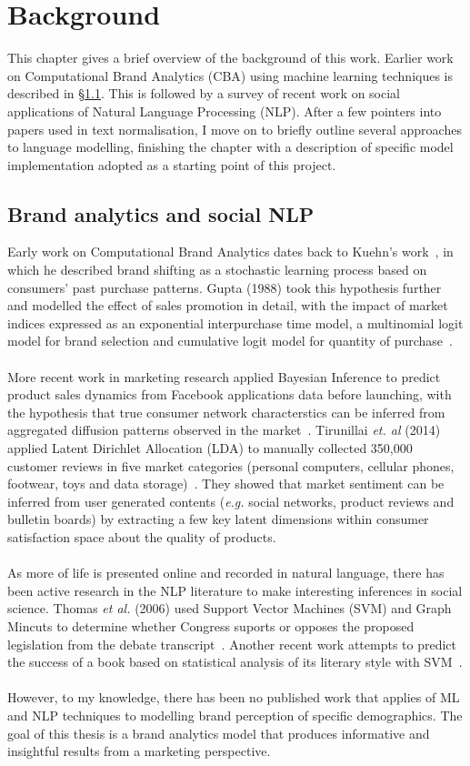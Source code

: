 \documentclass[a4paper,12pt,twoside,openright]{report}
\newcommand{\ti}{\textit}
\newcommand{\nl}{\\ \\}
\begin{document}
\chapter{Background}
\label{ch2}

This chapter gives a brief overview of the background of this work. Earlier work on Computational Brand Analytics (CBA) using machine learning techniques is described in \S\ref{ch2s1}. This is followed by a survey of recent work on social applications of Natural Language Processing (NLP). After a few pointers into papers used in text normalisation, I move on to briefly outline several approaches to language modelling, finishing the chapter with a description of specific model implementation adopted as a starting point of this project.

\section{Brand analytics and social NLP}
\label{ch2s1}

Early work on Computational Brand Analytics dates back to Kuehn's work~\cite{kuehn76}, in which he described brand shifting as a stochastic learning process based on consumers' past purchase patterns. Gupta (1988) took this hypothesis further and modelled the effect of sales promotion in detail, with the impact of market indices expressed as an exponential interpurchase time model, a multinomial logit model for brand selection and cumulative logit model for quantity of purchase~\cite{gupta88}.
\nl
More recent work in marketing research applied Bayesian Inference to predict product sales dynamics from Facebook applications data before launching, with the hypothesis that true consumer network characterstics can be inferred from aggregated diffusion patterns observed in the market~\cite{trusov13}. Tirunillai \ti{et. al} (2014) applied Latent Dirichlet Allocation (LDA) to manually collected 350,000 customer reviews in five market categories (personal computers, cellular phones, footwear, toys and data storage)~\cite{tirunillai14, tirunillai12}. They showed that market sentiment can be inferred from user generated contents (\ti{e.g.} social networks, product reviews and bulletin boards) by extracting a few key latent dimensions within consumer satisfaction space about the quality of products.
\nl
As more of life is presented online and recorded in natural language,  there has been active research in the NLP literature to make interesting inferences in social science. Thomas \ti{et al.} (2006) used Support Vector Machines (SVM) and Graph Mincuts to determine whether Congress suports or opposes the proposed legislation from the debate transcript~\cite{thomas06}. Another recent work attempts to predict the success of a book based on statistical analysis of its literary style with SVM~\cite{ashok13}. 
\nl
However, to my knowledge, there has been no published work that applies of ML and NLP techniques to modelling brand perception of specific demographics. The goal of this thesis is a brand analytics model that produces informative and insightful results from a marketing perspective.
\end{document}
